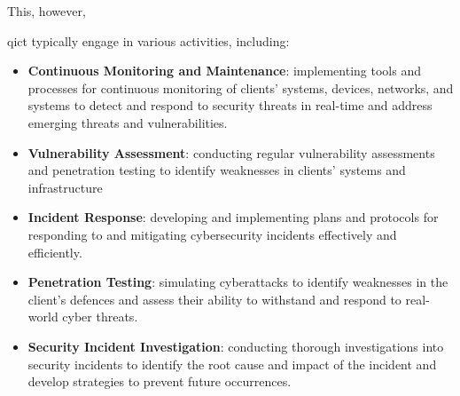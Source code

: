 % 

This, however,
% 

\acrshort{qict} typically engage in various activities, including:
\begin{itemize}
      \item \textbf{Continuous Monitoring and Maintenance}: implementing tools and processes for continuous
            monitoring of clients' systems, devices, networks, and systems to detect and respond to security
            threats in real-time and address emerging threats and vulnerabilities.
      \item \textbf{Vulnerability Assessment}: conducting regular vulnerability assessments and penetration
            testing to identify weaknesses in clients' systems and infrastructure
      \item \textbf{Incident Response}: developing and implementing plans and protocols for responding to
            and mitigating cybersecurity incidents effectively and efficiently.
      \item \textbf{Penetration Testing}: simulating cyberattacks to identify weaknesses in the client's
            defences and assess their ability to withstand and respond to real-world cyber threats.
      \item \textbf{Security Incident Investigation}: conducting thorough investigations into security
            incidents to identify the root cause and impact of the incident and develop strategies to prevent
            future occurrences.
\end{itemize}
